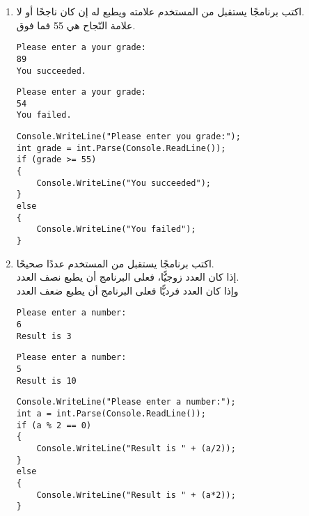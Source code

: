 \documentclass[12pt]{article}
\begin{document}
\begin{enumerate}
    \item اكتب برنامجًا يستقبل من المستخدم علامته ويطبع له إن كان ناجحًا أو لا. \\
    علامة النّجاح هي 55 فما فوق.
    \ifdetailed
    \begin{example}[1]
        \begin{english}
            \begin{lstlisting}
Please enter a your grade:
89
You succeeded.
\end{lstlisting}
\end{english}
\end{example}
    \begin{example}[2]
        \begin{english}
            \begin{lstlisting}
Please enter a your grade:
54
You failed.
\end{lstlisting}
\end{english}
\end{example}
\ifwithsols
\begin{solution}
    \begin{english}
    \begin{lstlisting}
Console.WriteLine("Please enter you grade:");
int grade = int.Parse(Console.ReadLine());
if (grade >= 55)
{
    Console.WriteLine("You succeeded");
}
else
{
    Console.WriteLine("You failed");
}
    \end{lstlisting}
\end{english}
\end{solution}
\fi
\fi
    \item اكتب برنامجًا يستقبل من المستخدم عددًا صحيحًا. \\
    إذا كان العدد زوجيًّا، فعلى البرنامج أن يطبع نصف العدد. \\
    وإذا كان العدد فرديًّا فعلى البرنامج أن يطبع ضعف العدد
    \ifdetailed
    \begin{example}[1]
        \begin{english}
            \begin{lstlisting}
Please enter a number:
6
Result is 3
\end{lstlisting}
\end{english}
\end{example}
    \begin{example}[2]
        \begin{english}
            \begin{lstlisting}
Please enter a number:
5
Result is 10
\end{lstlisting}
\end{english}
\end{example}
\ifwithsols
\begin{solution}
    \begin{english}
    \begin{lstlisting}
Console.WriteLine("Please enter a number:");
int a = int.Parse(Console.ReadLine());
if (a % 2 == 0)
{
    Console.WriteLine("Result is " + (a/2));
}
else
{
    Console.WriteLine("Result is " + (a*2));
}
    \end{lstlisting}
\end{english}
\end{solution}
\fi
\fi
\end{enumerate}
\end{document}

